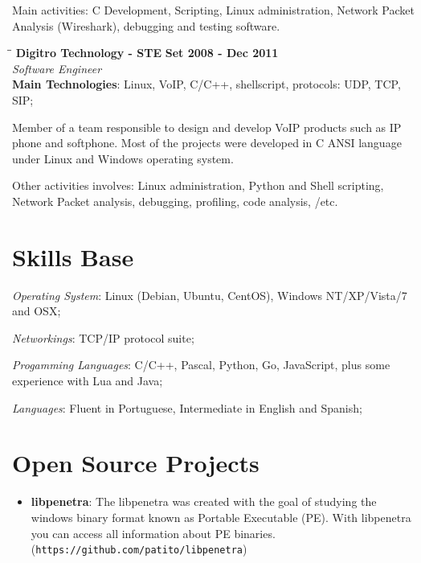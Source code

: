 \documentclass[margin]{res}
\begin{document}
\begin{resume}
    Main activities: C Development, Scripting, Linux administration, Network Packet Analysis (Wireshark), debugging  and testing software.

\vspace{-0.1in}   
   \begin{tabbing}
   \hspace{2.3in}\= \hspace{1.7in}\= \kill %
    \textbf{Digitro Technology - STE}    \>\>\textbf{Set 2008 - Dec 2011}\\
    \textit{Software Engineer}\\   
    \textbf{Main Technologies}: Linux, VoIP, C/C++, shellscript, protocols: UDP, TCP, SIP;
   \end{tabbing}\vspace{-20pt}      %
    \vspace{2mm}
    
    Member of a team responsible to design and develop VoIP products such as IP phone and 
    softphone. Most of the projects were developed in C ANSI language under Linux and Windows
    operating system.

    Other activities involves: Linux administration, Python and Shell scripting, Network Packet analysis, debugging, profiling, code analysis, /etc.
    

\section{Skills Base}

      \textit{Operating System}:  Linux (Debian, Ubuntu, CentOS), Windows NT/XP/Vista/7 and OSX;

			\textit{Networkings}: TCP/IP protocol suite;
  
			\textit{Progamming Languages}: C/C++, Pascal, Python, Go, JavaScript, plus some experience with Lua and Java;


			\textit{Languages}: Fluent in Portuguese, Intermediate in English and Spanish;
 
\section{Open Source Projects}
		\begin{itemize}
		    \vspace{2mm}
		    \item \textbf{libpenetra}: The libpenetra was created with the goal of studying the windows binary format known as Portable Executable (PE). With libpenetra you can access all information about PE binaries. (\texttt{https://github.com/patito/libpenetra}) \vspace{1mm}
		                               

\end{itemize}
\end{resume}
\end{document}
